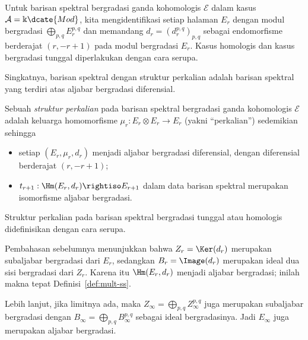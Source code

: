 \begin{convention}
	Untuk barisan spektral bergradasi ganda kohomologis $\mathscr{E}$ dalam
	kasus $\mathcal{A}=\Bbbk\dcate{Mod}$, kita mengidentifikasi setiap halaman
	$E_r$ dengan modul bergradasi $\bigoplus_{p,q}E_r^{p,q}$ dan memandang
	$d_r=(d_r^{p,q})_{p,q}$ sebagai endomorfisme berderajat $(r,-r+1)$ pada
	modul bergradasi $E_r$. Kasus homologis dan kasus bergradasi tunggal
	diperlakukan dengan cara serupa.
\end{convention}

Singkatnya, barisan spektral dengan struktur perkalian adalah barisan spektral
yang terdiri atas aljabar bergradasi diferensial.

\begin{definition}\label{def:mult-ss}
	Sebuah \emph{struktur perkalian} pada barisan spektral bergradasi ganda
	kohomologis $\mathscr{E}$ adalah keluarga homomorfisme
	$\mu_r:E_r\otimes E_r\to E_r$ (yakni ``perkalian'') sedemikian sehingga
	\begin{itemize}
		\item setiap $(E_r,\mu_r,d_r)$ menjadi aljabar bergradasi diferensial,
		dengan diferensial berderajat $(r,-r+1)$;
		\item $t_{r+1}:\Hm(E_r,d_r)\rightiso E_{r+1}$ dalam data barisan
		spektral merupakan isomorfisme aljabar bergradasi.
	\end{itemize}
	Struktur perkalian pada barisan spektral bergradasi tunggal atau homologis
	didefinisikan dengan cara serupa.
\end{definition}

Pembahasan sebelumnya menunjukkan bahwa $Z_r=\Ker(d_r)$ merupakan subaljabar
bergradasi dari $E_r$, sedangkan $B_r=\Image(d_r)$ merupakan ideal dua sisi
bergradasi dari $Z_r$. Karena itu $\Hm(E_r,d_r)$ menjadi aljabar bergradasi;
	inilah makna tepat Definisi~\ref{def:mult-ss}.

Lebih lanjut, jika limitnya ada, maka
$Z_\infty=\bigoplus_{p,q}Z_\infty^{p,q}$ juga merupakan subaljabar bergradasi
dengan $B_\infty=\bigoplus_{p,q}B_\infty^{p,q}$ sebagai ideal bergradasinya.
Jadi $E_\infty$ juga merupakan aljabar bergradasi.

